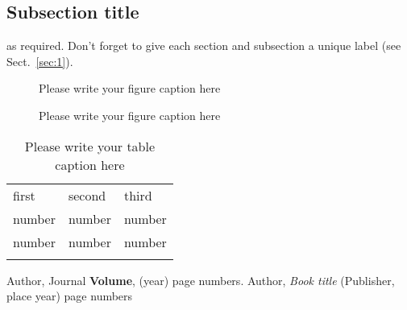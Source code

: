 \subsection{Subsection title}
\label{sec:2}
as required. Don't forget to give each section
and subsection a unique label (see Sect.~\ref{sec:1}).
%
\begin{figure}
\caption{Please write your figure caption here}
\label{fig:1}       %
\end{figure}
%
\begin{figure*}
\vspace*{5cm}       %
\caption{Please write your figure caption here}
\label{fig:2}       %
\end{figure*}
%
\begin{table}
\caption{Please write your table caption here}
\label{tab:1}       %
\begin{tabular}{lll}
\hline\noalign{\smallskip}
first & second & third  \\
\noalign{\smallskip}\hline\noalign{\smallskip}
number & number & number \\
number & number & number \\
\noalign{\smallskip}\hline
\end{tabular}
\vspace*{5cm}  %
\end{table}
%
% 
% 
%
\begin{thebibliography}{}
%
%
Author, Journal \textbf{Volume}, (year) page numbers.
Author, \textit{Book title} (Publisher, place year) page numbers
\end{thebibliography}





